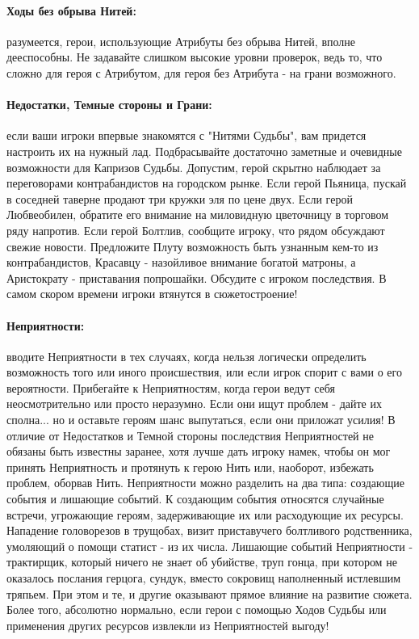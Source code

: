 \paragraph{Ходы без обрыва Нитей:} разумеется, герои, использующие Атрибуты без обрыва Нитей, вполне дееспособны. Не задавайте слишком высокие уровни проверок, ведь то, что сложно для героя с Атрибутом, для героя без Атрибута - на грани возможного.
\paragraph{Недостатки, Темные стороны и Грани:} если ваши игроки впервые знакомятся с "Нитями Судьбы", вам придется настроить их на нужный лад. Подбрасывайте достаточно заметные и очевидные возможности для Капризов Судьбы. Допустим, герой скрытно наблюдает за переговорами контрабандистов на городском рынке. Если герой Пьяница, пускай в соседней таверне продают три кружки эля по цене двух. Если герой Любвеобилен, обратите его внимание на миловидную цветочницу в торговом ряду напротив. Если герой Болтлив, сообщите игроку, что рядом обсуждают свежие новости. Предложите Плуту возможность быть узнанным кем-то из контрабандистов, Красавцу - назойливое внимание богатой матроны, а Аристократу - приставания попрошайки. Обсудите с игроком последствия. В самом скором времени игроки втянутся в сюжетостроение!
\paragraph{Неприятности:} вводите Неприятности в тех случаях, когда нельзя логически определить возможность того или иного происшествия, или если игрок спорит с вами о его вероятности. Прибегайте к Неприятностям, когда герои ведут себя неосмотрительно или просто неразумно. Если они ищут проблем - дайте их сполна... но и оставьте героям шанс выпутаться, если они приложат усилия! В отличие от Недостатков и Темной стороны последствия Неприятностей не обязаны быть известны заранее, хотя лучше дать игроку намек, чтобы он мог принять Неприятность и протянуть к герою Нить или, наоборот, избежать проблем, оборвав Нить.
\newline
Неприятности можно разделить на два типа: создающие события и лишающие событий. К создающим события относятся случайные встречи, угрожающие героям, задерживающие их или расходующие их ресурсы. Нападение головорезов в трущобах, визит приставучего болтливого родственника, умоляющий о помощи статист - из их числа. Лишающие событий Неприятности - трактирщик, который ничего не знает об убийстве, труп гонца, при котором не оказалось послания герцога, сундук, вместо сокровищ наполненный истлевшим тряпьем. При этом и те, и другие оказывают прямое влияние на развитие сюжета. Более того, абсолютно нормально, если герои с помощью Ходов Судьбы или применения других ресурсов извлекли из Неприятностей выгоду!
